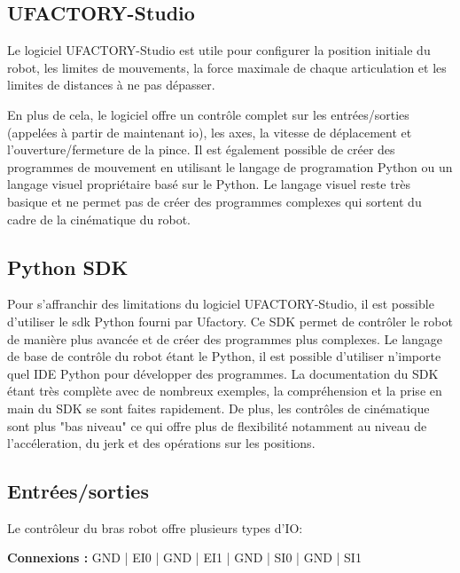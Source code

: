 \subsection{UFACTORY-Studio}
Le logiciel UFACTORY-Studio est utile pour configurer la position initiale du robot, les limites de mouvements, la force maximale de chaque articulation et les limites de distances à ne pas dépasser.

En plus de cela, le logiciel offre un contrôle complet sur les entrées/sorties (appelées à partir de maintenant \gls{io}), les axes, la vitesse de déplacement et l'ouverture/fermeture de la pince. Il est également possible de créer des programmes de mouvement en utilisant le langage  de programation Python ou un langage visuel propriétaire basé sur le Python. Le langage visuel reste très basique et ne permet pas de créer des programmes complexes qui sortent du cadre de la cinématique du robot.

\subsection{Python SDK}
Pour s'affranchir des limitations du logiciel UFACTORY-Studio, il est possible d'utiliser le \gls{sdk} Python \cite{PythonSDK} fourni par Ufactory. Ce SDK permet de contrôler le robot de manière plus avancée et de créer des programmes plus complexes. Le langage de base de contrôle du robot étant le Python, il est possible d'utiliser n'importe quel IDE Python pour développer des programmes. La documentation du SDK étant très complète avec de nombreux exemples, la compréhension et la prise en main du SDK se sont faites rapidement. De plus, les contrôles de cinématique sont plus "bas niveau" ce qui offre plus de flexibilité notamment au niveau de l'accéleration, du \gls{jerk} et des opérations sur les positions.

\subsection{Entrées/sorties}
Le contrôleur du bras robot offre plusieurs types d'IO:


\begin{tcolorbox}[colframe=black, colback=SafetyColor, title=Safety]
    \textbf{Connexions :} GND | EI0 | GND | EI1 | GND | SI0 | GND | SI1
\end{tcolorbox}

